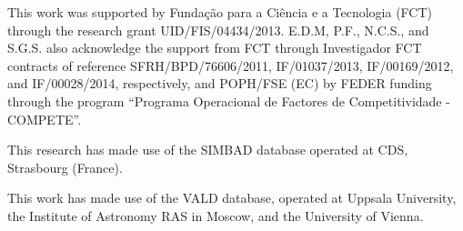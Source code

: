 \documentclass{aa}
\begin{document}
\begin{acknowledgements}

This work was supported by Funda\c{c}\~ao para a Ci\^encia e a
Tecnologia (FCT) through the research grant UID/FIS/04434/2013.
E.D.M, P.F., N.C.S., and S.G.S. also acknowledge the support from FCT
through Investigador FCT contracts of reference SFRH/BPD/76606/2011,
IF/01037/2013, IF/00169/2012, and IF/00028/2014, respectively, and
POPH/FSE (EC) by FEDER funding through the program “Programa
Operacional de Factores de Competitividade - COMPETE”.

This research has made use of the SIMBAD database operated at CDS,
Strasbourg (France).

This work has made use of the VALD database, operated at Uppsala
University, the Institute of Astronomy RAS in Moscow, and the University
of Vienna.

\end{acknowledgements}








\end{document}
